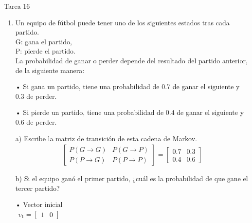 \documentclass[a4paper, 12pt]{article}
\newcommand{\Aspace}{0.2cm}
\begin{document}
    \begin{center}
        { \LARGE Tarea 16}
    \end{center}

    \begin{enumerate}
        \item Un equipo de fútbol puede tener uno de los siguientes estados tras cada partido. 
        \\G: gana el partido, 
        \\P: pierde el partido. 
        \\La probabilidad de ganar o perder depende del resultado del partido anterior, de la siguiente manera: \par
        • Si gana un partido, tiene una probabilidad de 0.7 de ganar el siguiente y 0.3 de perder. \par
        • Si pierde un partido, tiene una probabilidad de 0.4 de ganar el siguiente y 0.6 de perder.
            \vspace{\Aspace} \par
            a) Escribe la matriz de transición de esta cadena de Markov.
            \\ { \color{azul} 
                \[
                    \begin{array}{ccc}
                        \begin{bmatrix}
                            P(G \rightarrow G)  &   P(G \rightarrow P)  \\
                            P(P \rightarrow G)  &   P(P \rightarrow P)  
                        \end{bmatrix}
                    
                        =
                    
                        \begin{bmatrix}
                            0{.}7   &   0{.}3   \\
                            0{.}4   &   0{.}6
                        \end{bmatrix}
                    \end{array}
                \]
            }

            \vspace{\Aspace} \par
            b) Si el equipo ganó el primer partido, ¿cuál es la probabilidad de que gane el tercer partido?
            \\ { \color{azul} 
                • Vector inicial \\
                \(
                    \begin{array}{ccc}
                        v_{1}   
                        =
                        \begin{bmatrix}
                            1   &   0
                        \end{bmatrix}
                    \end{array}
                \)

}
\end{enumerate}
\end{document}
